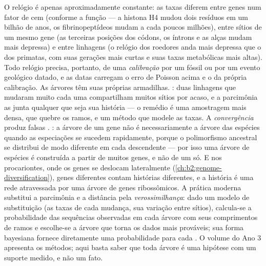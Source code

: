 \begin{proposition}\label{prop:b2:phylogenetic-trees:pitfalls}
O relógio é apenas aproximadamente constante: as taxas diferem entre
genes num fator de cem (conforme a função --- a histona H4 mudou dois
resíduos em um bilhão de anos, os fibrinopeptídeos mudam a cada poucos
milhões), entre sítios de um mesmo gene (as terceiras posições dos
códons, os íntrons e as alças mudam mais depressa) e entre linhagens (o
relógio dos roedores anda mais depressa que o dos primatas, com suas
gerações mais curtas e suas taxas metabólicas mais altas). Todo relógio
precisa, portanto, de uma \emph{calibração} por um fóssil ou por um
evento geológico datado, e as datas carregam o erro de Poisson acima e o
da própria calibração. As árvores têm suas próprias armadilhas.
\emph{}: duas linhagens que mudaram muito cada uma
compartilham muitos sítios por acaso, e a parcimônia as junta qualquer
que seja sua história --- o remédio é uma amostragem mais densa, que
quebre os ramos, e um método que modele as taxas. A \emph{convergência}
produz falsas . \emph{}: a
árvore de um gene não é necessariamente a árvore das espécies quando as
especiações se sucedem rapidamente, porque o polimorfismo ancestral se
distribui de modo diferente em cada descendente
--- por isso uma árvore de espécies é construída a partir de muitos
genes, e não de um só. E nos procariontes, onde os genes se deslocam
lateralmente (\cref{ch:b2:genome-diversification}), genes diferentes
contam histórias diferentes, e a história é uma rede atravessada por
uma árvore de genes ribossômicos. A prática moderna substitui a
parcimônia e a distância pela \emph{verossimilhança}: dado um modelo de
substituição (as taxas de cada mudança, sua variação entre sítios),
calcula-se a probabilidade das sequências observadas em cada árvore com
seus comprimentos de ramos e escolhe-se a árvore que torna os dados mais
prováveis; sua forma bayesiana fornece diretamente uma probabilidade
para cada . O volume do Ano 3 apresenta os métodos; aqui basta
saber que toda árvore é uma hipótese com um suporte medido, e não um
fato.
\end{proposition}
